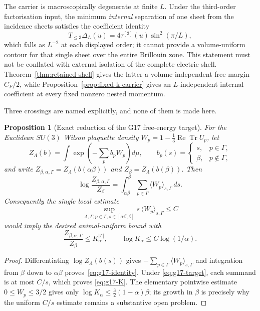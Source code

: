 \documentclass[11pt]{article}
\theoremstyle{plain}
\newtheorem{proposition}[theorem]{Proposition}
\theoremstyle{definition}
\theoremstyle{remark}
\newcommand{\chk}[1]{}
\newcommand{\CF}{C_F}
\begin{document}
The carrier is macroscopically degenerate at finite $L$. Under the
third-order factorisation input, the minimum \emph{internal} separation of one
sheet from the incidence sheets satisfies the coefficient identity
\[
 T_{\le3}\Delta_L(u)
 =4\tau^{[3]}(u)\sin^2(\pi/L),
\]
which falls as $L^{-2}$ at each displayed order; it cannot
provide a volume-uniform contour for that single sheet over the entire
Brillouin zone. This statement must not be conflated with external isolation
of the complete electric shell. Theorem~\ref{thm:retained-shell} gives the
latter a volume-independent free margin $\CF/2$, while
Proposition~\ref{prop:fixed-k-carrier} gives an $L$-independent internal
coefficient at every fixed nonzero nested momentum.
\chk{Delta\_L = 4 tau(u) sin\^{}2(pi/L) is positive and falls as L\^{}-2}

Three crossings are named explicitly, and none of them is made here.

\begin{proposition}[Exact reduction of the G17 free-energy target]
\label{prop:g17-reduction}
For the Euclidean $SU(3)$ Wilson plaquette density
$W_p=1-\frac13\operatorname{Re}\operatorname{Tr}U_p$, let
\[
 Z_\Lambda(b)=\int
 \exp\!\left(-\sum_p b_pW_p\right)d\mu,
 \qquad
 b_p(s)=\begin{cases}s,&p\in\Gamma,\\ \beta,&p\notin\Gamma,
 \end{cases}
\]
and write $Z_{\beta,\alpha,\Gamma}=Z_\Lambda(b(\alpha\beta))$ and
$Z_\beta=Z_\Lambda(b(\beta))$. Then
\begin{equation}\label{eq:g17-identity}
 \log\frac{Z_{\beta,\alpha,\Gamma}}{Z_\beta}
 =\int_{\alpha\beta}^{\beta}
   \sum_{p\in\Gamma}\langle W_p\rangle_{s,\Gamma}\,ds .
\end{equation}
Consequently the single local estimate
\begin{equation}\label{eq:g17-target}
 \sup_{\Lambda,\Gamma,p\in\Gamma,
 s\in[\alpha\beta,\beta]}
 s\,\langle W_p\rangle_{s,\Gamma}\le C
\end{equation}
would imply the desired animal-uniform bound with
\begin{equation}\label{eq:g17-K}
 \frac{Z_{\beta,\alpha,\Gamma}}{Z_\beta}
 \le K_\alpha^{|\Gamma|},
 \qquad \log K_\alpha\le C\log(1/\alpha).
\end{equation}
\end{proposition}

\begin{proof}
Differentiating $\log Z_\Lambda(b(s))$ gives
$-\sum_{p\in\Gamma}\langle W_p\rangle_{s,\Gamma}$ and integration from
$\beta$ down to $\alpha\beta$ proves~\eqref{eq:g17-identity}. Under
\eqref{eq:g17-target}, each summand is at most $C/s$, which proves
\eqref{eq:g17-K}. The elementary pointwise estimate
$0\le W_p\le3/2$ gives only
$\log K_\alpha\le\frac32(1-\alpha)\beta$; its growth in $\beta$ is precisely
why the uniform $C/s$ estimate remains a substantive open problem.
\end{proof}
\end{document}
